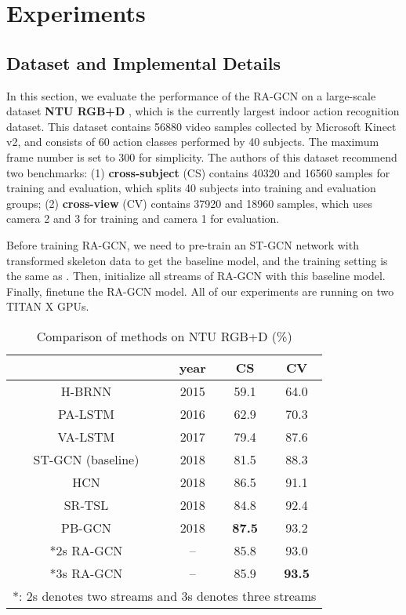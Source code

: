 \documentclass{article}
\begin{document}
\section{Experiments}
\label{sec:experiments}

\subsection{Dataset and Implemental Details}
\label{ssec:dataset}

In this section, we evaluate the performance of the RA-GCN on a large-scale dataset {\bf NTU RGB+D} \cite{Shahroudy2016}, which is the currently largest indoor action recognition dataset. This dataset contains 56880 video samples collected by Microsoft Kinect v2, and consists of 60 action classes performed by 40 subjects. The maximum frame number  is set to 300 for simplicity. The authors of this dataset recommend two benchmarks:  (1) {\bf cross-subject} (CS) contains 40320 and 16560 samples for training and evaluation, which splits 40 subjects into training and evaluation groups; (2) {\bf cross-view} (CV) contains 37920 and 18960 samples, which uses camera 2 and 3 for training and camera 1 for evaluation.

Before training RA-GCN, we need to pre-train an ST-GCN network with transformed skeleton data to get the baseline model, and the training setting is the same as \cite{Yan2018}. Then, initialize all streams of RA-GCN with this baseline model. Finally, finetune the RA-GCN model. All of our experiments are running on two TITAN X GPUs.

\begin{table}
\label{tab:1}
\caption{Comparison of methods on NTU RGB+D (\%)}
\centering
\begin{tabular}{cccc}
\hline
& year & CS & CV \\
\hline
H-BRNN \cite{Du2015} & 2015 & 59.1 & 64.0 \\
PA-LSTM \cite{Shahroudy2016} & 2016 & 62.9 & 70.3 \\
VA-LSTM \cite{Zhang2017b} & 2017 & 79.4 & 87.6 \\
ST-GCN (baseline) \cite{Yan2018} & 2018 & 81.5 & 88.3 \\
HCN \cite{Li2018} & 2018 & 86.5 & 91.1 \\
SR-TSL \cite{Si2018} & 2018 & 84.8 & 92.4 \\
PB-GCN \cite{Thakkar2018} & 2018 & {\bf 87.5} & 93.2 \\
\hline
*2s RA-GCN & -- & 85.8 & 93.0 \\
*3s RA-GCN & -- & 85.9 & {\bf 93.5} \\
\hline
\multicolumn{4}{l}{*: 2s denotes two streams and 3s denotes three streams}
\end{tabular}
\end{table}
\end{document}
